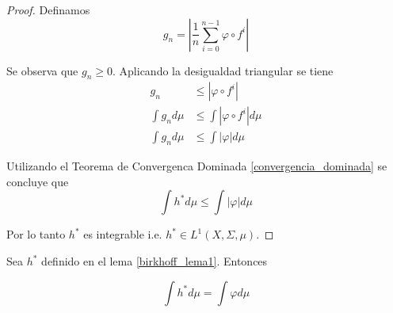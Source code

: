 \begin{proof}
	Definamos
	\begin{equation}
		g_n = \left| \frac{1}{n} \sum_{i=0}^{n-1} \varphi \circ f^i \right|
	\end{equation}
	
	Se observa que $g_n \geq 0$. Aplicando la desigualdad triangular se tiene
	\begin{align}
		g_n &\leq |\varphi \circ f^i|\\		
		\int g_n d\mu &\leq \int |\varphi \circ f^i| d\mu\\
		\int g_n d\mu &\leq \int |\varphi| d\mu
	\end{align}
	
	Utilizando el Teorema de Convergenca Dominada \ref{convergencia_dominada} se concluye que
	\begin{equation}
		\int h^* d\mu \leq \int |\varphi| d\mu
	\end{equation}
	
	Por lo tanto $h^*$ es integrable i.e. $h^* \in L^1(X,\Sigma,\mu)$.
\end{proof}

\begin{lema}\label{birkhoff_lema3}
	Sea $h^*$  definido en el lema \ref{birkhoff_lema1}. Entonces
	
	\begin{equation}
		\int h^* d\mu = \int \varphi d\mu
	\end{equation}
\end{lema}

